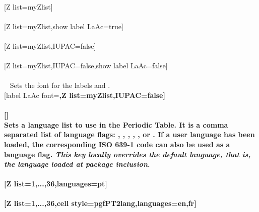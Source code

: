 \pgfPTstyle[show title=false,show legend=false,show group numbers=false]%
\\ [-4pt][Z list=myZlist]%
\\ [5pt]\makebox[\linewidth][c]{\scalebox{.6}{\pgfPT[Z list=myZlist]}}%
\\ [5pt][Z list=myZlist,show label LaAc=true]%
\\ [5pt]\makebox[\linewidth][c]{\scalebox{.6}{\pgfPT[Z list=myZlist,show label LaAc=true]}}%
\\ [5pt][Z list=myZlist,IUPAC=false]%
\\ [5pt]\makebox[\linewidth][c]{\scalebox{.6}{\pgfPT[Z list=myZlist,IUPAC=false]}}%
\\ [5pt][Z list=myZlist,IUPAC=false,show label LaAc=false]%
\\ [5pt]\makebox[\linewidth][c]{\scalebox{.6}{\pgfPT[Z list=myZlist,IUPAC=false,show label LaAc=false]}}%
\\ [5pt]\pgfPTendoption%
\newpage\vspace{-34pt}\ %
\label{option_label LaAc font}%
%
{Sets the font for the labels  and .}%
\\ [5pt][label LaAc font=\string\bfseries,Z list=myZlist,IUPAC=false]%
\\ [10pt]\makebox[\linewidth][c]{\scalebox{.6}{\pgfPT[label LaAc font=\bfseries,Z list=myZlist,IUPAC=false]}}%
\\ [5pt][]%
\pgfPTresetstyle%
\\ [-10pt]\pgfPTendoption%
\vfill
\label{option_languages}%
%
{Sets a language list to use in the Periodic Table. It is a comma separated list of language flags: , , , , ,  or . If a user language has been loaded, the corresponding ISO 639-1 code can also be used as a language flag. \textit{This key locally overrides the default language, that is, the language loaded at package inclusion}.\\ \ }%
\\ [5pt][Z list={1,...,36},languages=pt]%
\\ [10pt]\makebox[\linewidth][c]{\scalebox{.6}{\pgfPT[Z list={1,...,36},languages=pt]}}%
\\ [10pt][Z list={1,...,36},cell style=pgfPT2lang,languages={en,fr}]%
